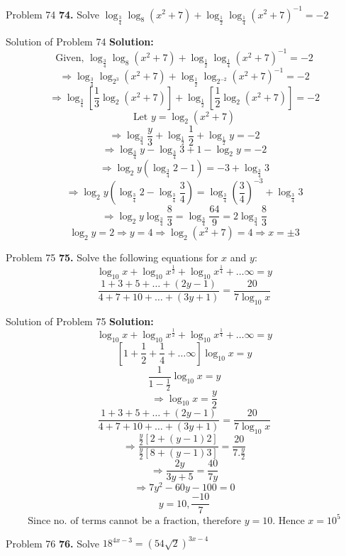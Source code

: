 \documentclass[aspectratio=1610,8pt]{beamer}
\begin{document}
\begin{frame}{Problem 74}
  \textbf{74.} Solve $\log_{\frac{3}{4}}\log_8(x^2 + 7) + \log_{\frac{1}{2}}\log_{\frac{1}{4}}(x^2 + 7)^{-1} = -2$
\end{frame}
\begin{frame}{Solution of Problem 74}
  \textbf{Solution:} $$\text{Given,~}\log_{\frac{3}{4}}\log_8(x^2 + 7) + \log_{\frac{1}{2}}\log_{\frac{1}{4}}(x^2 + 7)^{-1} = -2$$
  $$\Rightarrow \log_{\frac{3}{4}}\log_{2^3}(x^2 + 7)+ \log_{\frac{1}{2}}\log_{2^{-2}}(x^2 + 7)^{-1} = -2$$
  $$\Rightarrow \log_{\frac{3}{4}}[\frac{1}{3}\log_2(x^2 + 7)] + \log_{\frac{1}{2}}[\frac{1}{2}\log_2(x^2 + 7)] = -2$$
  $$\text{Let~}y = \log_2(x^2 + 7)$$
  $$\Rightarrow \log_{\frac{3}{4}}\frac{y}{3} + \log_{\frac{1}{2}}\frac{1}{2} + \log_{\frac{1}{2}}y = -2$$
  $$\Rightarrow \log_{\frac{3}{4}}y - \log_{\frac{3}{4}}3 + 1 - \log_2y = -2$$
  $$\Rightarrow \log_2y(\log_{\frac{3}{4}}2 - 1) = -3 + \log_{\frac{3}{4}}3$$
  $$\Rightarrow \log_2y\left(\log_{\frac{3}{4}}2 - \log_{\frac{3}{4}}\frac{3}{4}\right) = \log_{\frac{3}{4}}\left(\frac{3}{4}\right)^{-3}+ \log_{\frac{3}{4}}3$$
  $$\Rightarrow \log_2y\log_{\frac{3}{4}}\frac{8}{3} = \log_{\frac{3}{4}}\frac{64}{9} = 2\log_{\frac{3}{4}}\frac{8}{3}$$
  $$\log_2y = 2 \Rightarrow y = 4 \Rightarrow \log_2(x^2 + 7) = 4 \Rightarrow x = \pm3$$
\end{frame}
\begin{frame}{Problem 75}
  \textbf{75.} Solve the following equations for $x$ and $y:$
  $$\log_{10}x + \log_{10}x^{\frac{1}{2}} + \log_{10}x^{\frac{1}{4}} + \ldots \infty = y$$
  $$\frac{1 + 3 + 5 + \ldots + (2y - 1)}{4 + 7 + 10 + \ldots + (3y + 1)} = \frac{20}{7\log_{10}x}$$
\end{frame}
\begin{frame}{Solution of Problem 75}
  \textbf{Solution:} $$\log_{10}x + \log_{10}x^{\frac{1}{2}} + \log_{10}x^{\frac{1}{4}} + \ldots \infty = y$$
  $$\left[1 + \frac{1}{2} + \frac{1}{4} + \ldots \infty\right]\log_{10}x= y$$
  $$\frac{1}{1 - \frac{1}{2}}\log_{10}x = y$$
  $$\Rightarrow \log_{10}x = \frac{y}{2}$$
  $$\frac{1 + 3 + 5 + \ldots + (2y - 1)}{4 + 7 + 10 + \ldots + (3y + 1)} = \frac{20}{7\log_{10}x}$$
  $$\Rightarrow \frac{\frac{y}{2}[2 + (y - 1)2]}{\frac{y}{2}[8 + (y - 1)3]} = \frac{20}{7.\frac{y}{2}}$$
  $$\Rightarrow \frac{2y}{3y + 5} = \frac{40}{7y}$$
  $$\Rightarrow 7y^2 - 60y - 100 = 0$$
  $$y = 10, \frac{-10}{7}$$
  $$\text{Since no. of terms cannot be a fraction, therefore~}y = 10.\text{~Hence~}x =10^5$$
\end{frame}
\begin{frame}{Problem 76}
  \textbf{76.} Solve $18^{4x - 3} = (54\sqrt{2})^{3x - 4}$
\end{frame}
\end{document}
